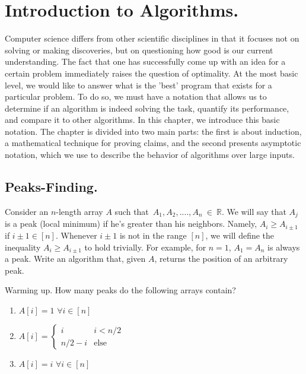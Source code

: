 
\newcommand*{\RECITATION}{}%


\chapter{Introduction to Algorithms.}
\ifdefined\RECITATION
\else
Computer science differs from other scientific disciplines in that it focuses not on solving or making discoveries, but on questioning how good is our current understanding. The fact that one has successfully come up with an idea for a certain problem immediately raises the question of optimality. At the most basic level, we would like to answer what is the 'best'  program that exists for a particular problem. To do so, we must have a notation that allows us to determine if an algorithm is indeed solving the task, quantify its performance, and compare it to other algorithms. In this chapter, we introduce this basic notation. The chapter is divided into two main parts: the first is about induction, a mathematical technique for proving claims, and the second presents asymptotic notation, which we use to describe the behavior of algorithms over large inputs.
\fi
\section{Peaks-Finding.}
\begin{example}
Consider an \(n\)-length array $A$ such that~$A_1,A_2,....,A_n~\in~\mathbb{R}$. We will say that $A_{j}$ is a peak (local minimum) if he's greater than his neighbors. Namely, $A_{i} \ge A_{i\pm1}$ if $i\pm 1 \in [n]$. Whenever $i\pm 1$ is not in the range $[n]$, we will define the inequality $A_{i} \ge A_{i\pm 1}$ to hold trivially. For example, for $n=1$, $A_{1}=A_{n}$ is always a peak. Write an algorithm that, given $A$, returns the position of an arbitrary peak.
\end{example}


\begin{example}{Warming up.} \label{example:func} How many peaks do the following arrays contain?
  \begin{enumerate}
    \item $A[i] = 1$   $\forall i \in [n]$
    \item $A[i] = \begin{cases}
        i & i < n/2 \\
        n/2 - i & \text{else}
      \end{cases}$
    \item $A[i] = i $  $\forall i \in [n]$
  \end{enumerate}
\end{example}

